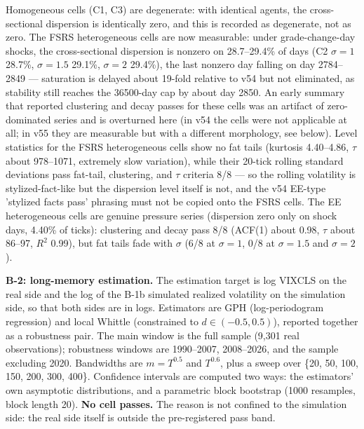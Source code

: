 \documentclass[11pt]{article}
\begin{document}
Homogeneous cells (C1, C3) are degenerate: with identical agents, the cross-sectional dispersion is identically zero, and this is recorded as degenerate, not as zero. The FSRS heterogeneous cells are now measurable: under grade-change-day shocks, the cross-sectional dispersion is nonzero on 28.7--29.4\% of days (C2 $\sigma=1$ 28.7\%, $\sigma=1.5$ 29.1\%, $\sigma=2$ 29.4\%), the last nonzero day falling on day 2784--2849 --- saturation is delayed about 19-fold relative to v54 but not eliminated, as stability still reaches the 36500-day cap by about day 2850. An early summary that reported clustering and decay passes for these cells was an artifact of zero-dominated series and is overturned here (in v54 the cells were not applicable at all; in v55 they are measurable but with a different morphology, see below). Level statistics for the FSRS heterogeneous cells show no fat tails (kurtosis 4.40--4.86, $\tau$ about 978--1071, extremely slow variation), while their 20-tick rolling standard deviations pass fat-tail, clustering, and $\tau$ criteria 8/8 --- so the rolling volatility is stylized-fact-like but the dispersion level itself is not, and the v54 EE-type 'stylized facts pass' phrasing must not be copied onto the FSRS cells. The EE heterogeneous cells are genuine pressure series (dispersion zero only on shock days, 4.40\% of ticks): clustering and decay pass 8/8 (ACF(1) about 0.98, $\tau$ about 86--97, $R^2$ 0.99), but fat tails fade with $\sigma$ (6/8 at $\sigma=1$, 0/8 at $\sigma=1.5$ and $\sigma=2$).

\textbf{B-2: long-memory estimation.} The estimation target is log VIXCLS on the real side and the log of the B-1b simulated realized volatility on the simulation side, so that both sides are in logs. Estimators are GPH (log-periodogram regression) and local Whittle (constrained to $d \in (-0.5, 0.5)$), reported together as a robustness pair. The main window is the full sample (9,301 real observations); robustness windows are 1990--2007, 2008--2026, and the sample excluding 2020. Bandwidths are $m = T^{0.5}$ and $T^{0.6}$, plus a sweep over \{20, 50, 100, 150, 200, 300, 400\}. Confidence intervals are computed two ways: the estimators' own asymptotic distributions, and a parametric block bootstrap (1000 resamples, block length 20). \textbf{No cell passes.} The reason is not confined to the simulation side: the real side itself is outside the pre-registered pass band.
\end{document}
